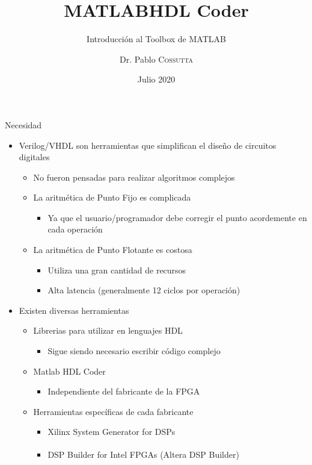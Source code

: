 \documentclass{beamer}
\title[HDL Coder]{MATLAB\texttrademark \space HDL Coder}
\subtitle{Introducción al Toolbox de MATLAB\texttrademark}
\author{Dr. Pablo \textsc{Cossutta}}
\institute[]{}
\date{Julio 2020}
\begin{document}
\beamertemplatenavigationsymbolsempty %
\maketitle
\logo{}

\renewcommand{\arraystretch}{1.3}

\begin{frame}{Necesidad}
	\begin{itemize}
		\item Verilog/VHDL son herramientas que simplifican el diseño de circuitos digitales
		\begin{itemize}
			\item No fueron pensadas para realizar algoritmos complejos
			\item La aritmética de Punto Fijo es complicada
			\begin{itemize}
				\item Ya que el usuario/programador debe corregir el punto acordemente en cada operación
			\end{itemize}
			\item La aritmética de Punto Flotante es costosa
			\begin{itemize}
				\item Utiliza una gran cantidad de recursos
				\item Alta latencia (generalmente 12 ciclos por operación)
			\end{itemize}
		\end{itemize}
		\item Existen diversas herramientas
		\begin{itemize}
			\item Librerias para utilizar en lenguajes HDL
			\begin{itemize}
				\item Sigue siendo necesario escribir código complejo
			\end{itemize}
			\item Matlab HDL Coder
			\begin{itemize}
				\item Independiente del fabricante de la FPGA
			\end{itemize}
			\item Herramientas específicas de cada fabricante
			\begin{itemize}
				\item Xilinx System Generator for DSPs
				\item DSP Builder for Intel\textsuperscript{\textregistered} FPGAs (Altera DSP Builder)
			\end{itemize}
		\end{itemize}
	\end{itemize}
\end{frame}
\end{document}
